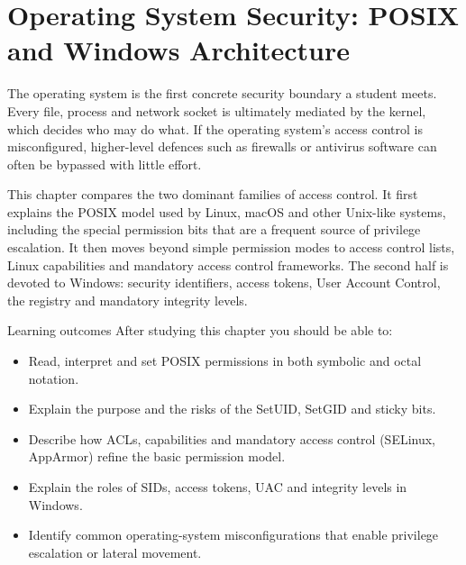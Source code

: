 \chapter{Operating System Security: POSIX and Windows Architecture}\label{ch:2}

The operating system is the first concrete security boundary a student meets. Every file, process and network socket is ultimately mediated by the kernel, which decides who may do what. If the operating system's access control is misconfigured, higher-level defences such as firewalls or antivirus software can often be bypassed with little effort.

This chapter compares the two dominant families of access control. It first explains the POSIX model used by Linux, macOS and other Unix-like systems, including the special permission bits that are a frequent source of privilege escalation. It then moves beyond simple permission modes to access control lists, Linux capabilities and mandatory access control frameworks. The second half is devoted to Windows: security identifiers, access tokens, User Account Control, the registry and mandatory integrity levels.

\begin{outcomesbox}{Learning outcomes}
After studying this chapter you should be able to:
\begin{itemize}
  \item Read, interpret and set POSIX permissions in both symbolic and octal notation.
  \item Explain the purpose and the risks of the SetUID, SetGID and sticky bits.
  \item Describe how ACLs, capabilities and mandatory access control (SELinux, AppArmor) refine the basic permission model.
  \item Explain the roles of SIDs, access tokens, UAC and integrity levels in Windows.
  \item Identify common operating-system misconfigurations that enable privilege escalation or lateral movement.
\end{itemize}
\end{outcomesbox}

